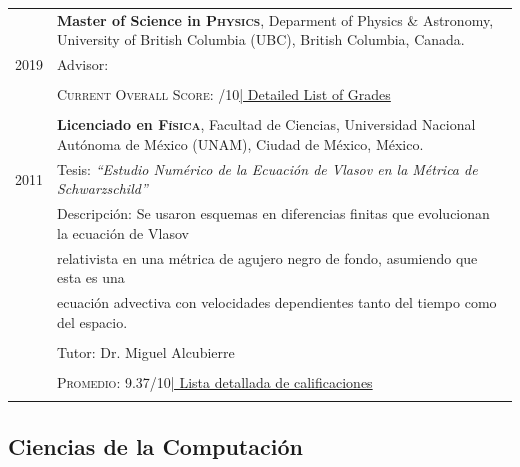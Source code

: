\documentclass[a4paper,10pt]{article} %
\begin{document}
\begin{tabular}{r|p{14.5cm}}	
	

	
	\textsc{2018} & \textbf{Licenciado en \textsc{\large{Física}}}, Facultad de Ciencias, Universidad Nacional Autónoma de México (UNAM), \small Ciudad de México, México.\\
	\textsc{2011} & Tesis: \emph{``Estudio Numérico de la Ecuación de Vlasov en la Métrica de Schwarzschild''}\\
	&\small Descripción: Se usaron esquemas en diferencias finitas que evolucionan la ecuación de Vlasov\\
	&\hspace{1.7cm} \small relativista en una métrica de agujero negro de fondo, asumiendo que esta es una\\
	&\hspace{1.7cm} \small ecuación advectiva con velocidades dependientes tanto del tiempo como del espacio.\\
	&\hspace{1.7cm} \small \\
	& \small Tutor: Dr. Miguel Alcubierre\\
	& \\
	&\normalsize \textsc{Promedio}: 9.37/10\hyperlink{grdsbach}{\hfill | \footnotesize Lista detallada de calificaciones}\\
	\multicolumn{2}{c}{}\\
	
	
\end{tabular}	

\subsection*{Ciencias de la Computación}
\end{document}
